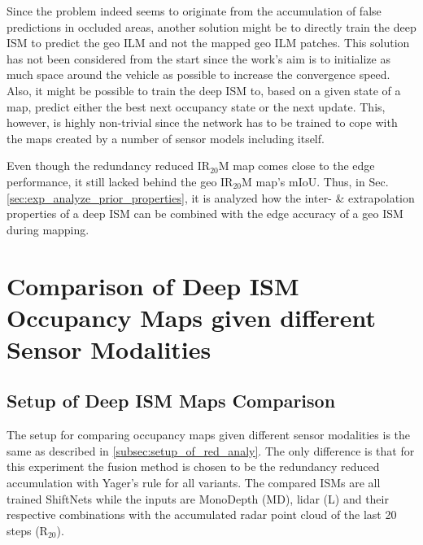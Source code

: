 Since the problem indeed seems to originate from the accumulation of false predictions in occluded areas, another solution might be to directly train the deep ISM to predict the geo ILM and not the mapped geo ILM patches. This solution has not been considered from the start since the work's aim is to initialize as much space around the vehicle as possible to increase the convergence speed. Also, it might be possible to train the deep ISM to, based on a given state of a map, predict either the best next occupancy state or the next update. This, however, is highly non-trivial since the network has to be trained to cope with the maps created by a number of sensor models including itself. 

Even though the redundancy reduced IR$_{20}$M map comes close to the edge performance, it still lacked behind the geo IR$_{20}$M map's mIoU. Thus, in Sec. \ref{sec:exp_analyze_prior_properties}, it is analyzed how the inter- \& extrapolation properties of a deep ISM can be combined with the edge accuracy of a geo ISM during mapping.
%
\section{Comparison of Deep ISM Occupancy Maps given different Sensor Modalities}
\label{sec:exp_comparison_deep_ism_maps_diff_sensors}
%
\subsection{Setup of Deep ISM Maps Comparison}
\label{subsec:setup_analyze_deep_ism_maps_diff_sensors}
The setup for comparing occupancy maps given different sensor modalities is the same as described in \ref{subsec:setup_of_red_analy}. The only difference is that for this experiment the fusion method is chosen to be the redundancy reduced accumulation with Yager's rule for all variants. The compared ISMs are all trained ShiftNets while the inputs are MonoDepth (MD), lidar (L) and their respective combinations with the accumulated radar point cloud of the last 20 steps (R$_{20}$). 
%
